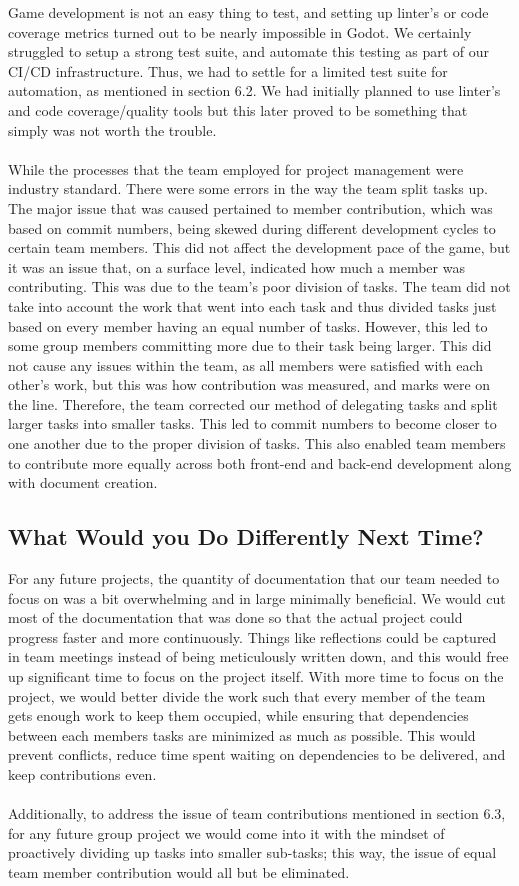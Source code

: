 \documentclass{article}
\begin{document}
Game development is not an easy thing to test, and setting up linter's or code coverage metrics turned out to be nearly impossible in Godot. We certainly struggled to setup a strong test suite, and automate this testing as part of our CI/CD infrastructure. Thus, we had to settle for a limited test suite for automation, as mentioned in section 6.2. We had initially planned to use linter's and code coverage/quality tools but this later proved to be something that simply was not worth the trouble. 
\\
\\
While the processes that the team employed for project management were industry standard. There were some errors in the way the team split tasks up. The major issue that was caused pertained to member contribution, which was based on commit numbers, being skewed during different development cycles to certain team members. This did not affect the development pace of the game, but it was an issue that, on a surface level, indicated how much a member was contributing. This was due to the team's poor division of tasks. The team did not take into account the work that went into each task and thus divided tasks just based on every member having an equal number of tasks. However, this led to some group members committing more due to their task being larger. This did not cause any issues within the team, as all members were satisfied with each other's work, but this was how contribution was measured, and marks were on the line. Therefore, the team corrected our method of delegating tasks and split larger tasks into smaller tasks. This led to commit numbers to become closer to one another due to the proper division of tasks. This also enabled team members to contribute more equally across both front-end and back-end development along with document creation.

\subsection{What Would you Do Differently Next Time?}

For any future projects, the quantity of documentation that our team needed to focus on was a bit overwhelming and in large minimally beneficial. We would cut most of the documentation that was done so that the actual project could progress faster and more continuously. Things like reflections could be captured in team meetings instead of being meticulously written down, and this would free up significant time to focus on the project itself. With more time to focus on the project, we would better divide the work such that every member of the team gets enough work to keep them occupied, while ensuring that dependencies between each members tasks are minimized as much as possible. This would prevent conflicts, reduce time spent waiting on dependencies to be delivered, and keep contributions even.
\\
\\
Additionally, to address the issue of team contributions mentioned in section 6.3, for any future group project we would come into it with the mindset of proactively dividing up tasks into smaller sub-tasks; this way, the issue of equal team member contribution would all but be eliminated.
\end{document}
